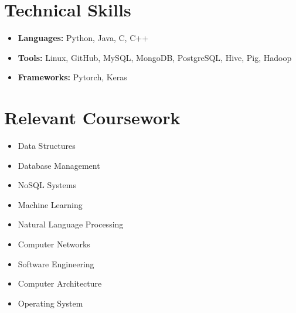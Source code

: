 \documentclass[letterpaper,11pt]{article}
\makeatletter
\newcommand{\resumeItem}[1]{
  \item\small{
    {#1 \vspace{-2pt}}
  }
}
\newcommand{\resumeSubheading}[4]{
  \vspace{-2pt}\item
    \begin{tabular*}{1.0\textwidth}[t]{l@{\extracolsep{\fill}}r}
      \textbf{#1} & \textbf{\small #2} \\
      \textit{\small#3} & \textit{\small #4} \\
    \end{tabular*}\vspace{-7pt}
}
\newcommand{\resumeSubHeadingListStart}{\begin{itemize}[leftmargin=0.0in, label={}]}
\newcommand{\resumeSubHeadingListEnd}{\end{itemize}}
\newcommand{\resumeItemListStart}{\begin{itemize}}
\newcommand{\resumeItemListEnd}{\end{itemize}\vspace{-5pt}}
\makeatother
\begin{document}
%
\section{Technical Skills}
 \begin{itemize}[leftmargin=0.15in, label={},itemsep=-1pt]
     \item \small{\textbf{Languages:}{ Python, Java, C, C++ }}
     \item \small{\textbf{Tools:}{ Linux, GitHub, MySQL, MongoDB, PostgreSQL, Hive, Pig, Hadoop }}
     \item \small{\textbf{Frameworks:}{ Pytorch, Keras }}
 \end{itemize}
 \vspace{-16pt}



\section{Relevant Coursework}
        \begin{multicols}{3}
            \begin{itemize}[itemsep=-5pt, parsep=3pt]
                \item  Data Structures
                \item Database Management
                \item NoSQL Systems
                \item Machine Learning
                \item  Natural Language Processing
                \item Computer Networks
                \item Software Engineering
                \item Computer Architecture
                \item Operating System
            \end{itemize}
        \end{multicols}
        \vspace*{2.0\multicolsep}


        
\end{document}
